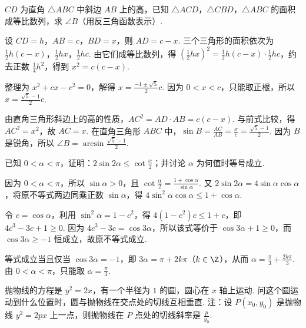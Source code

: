 \begin{problem}
\(CD\) 为直角 \(\triangle ABC\) 中斜边 \(AB\) 上的高，已知 \(\triangle ACD\)，\(\triangle CBD\)，\(\triangle ABC\) 的面积成等比数列，求 \(\angle B\)（用反三角函数表示）.
\end{problem}

\begin{solution}
设 \(CD=h\)，\(AB=c\)，\(BD=x\)，则 \(AD=c-x\). 三个三角形的面积依次为 \(\frac12h(c-x)\)，\(\frac12hx\)，\(\frac12hc\). 由它们成等比数列，得 \(\left(\frac12hx\right)^2=\frac12h(c-x)\cdot\frac12hc\)，约去正数 \(\frac14h^2\)，得到 \(x^2=c(c-x)\).

整理为 \(x^2+cx-c^2=0\)，解得 \(x=\frac{-1\pm\sqrt{5}}{2}c\). 因为 \(0<x<c\)，只能取正根，所以 \(x=\frac{\sqrt{5}-1}{2}c\).

由直角三角形斜边上的高的性质，\(AC^2=AD\cdot AB=c(c-x)\). 与前式比较，得 \(AC^2=x^2\)，故 \(AC=x\). 在直角三角形 \(ABC\) 中，\(\sin B=\frac{AC}{AB}=\frac{x}{c}=\frac{\sqrt{5}-1}{2}\). 因为 \(B\) 是锐角，所以 \(\angle B=\arcsin\frac{\sqrt{5}-1}{2}\).
\end{solution}

\begin{problem}
已知 \(0 < \alpha < \pi\)，证明：\(2\sin 2\alpha\leqslant\cot\frac{\alpha}{2}\)；并讨论 \(\alpha\) 为何值时等号成立.
\end{problem}

\begin{solution}
因为 \(0<\alpha<\pi\)，所以 \(\sin\alpha>0\)，且 \(\cot\frac{\alpha}{2}=\frac{1+\cos\alpha}{\sin\alpha}\). 又 \(2\sin 2\alpha=4\sin\alpha\cos\alpha\)，将原不等式两边同乘正数 \(\sin\alpha\)，得 \(4\sin^{2}\alpha\cos\alpha\leqslant1+\cos\alpha\).

令 \(c=\cos\alpha\)，利用 \(\sin^{2}\alpha=1-c^{2}\)，得 \(4(1-c^{2})c\leqslant1+c\)，即 \(4c^{3}-3c+1\geqslant0\). 因为 \(4c^{3}-3c=\cos 3\alpha\)，所以该式等价于 \(\cos 3\alpha+1\geqslant0\)，而 \(\cos 3\alpha\geqslant-1\) 恒成立，故原不等式成立.

等式成立当且仅当 \(\cos 3\alpha=-1\)，即 \(3\alpha=\pi+2k\pi\)（\(k\in\Z\)），从而 \(\alpha=\frac{\pi}{3}+\frac{2k\pi}{3}\). 由 \(0<\alpha<\pi\)，只能取 \(\alpha=\frac{\pi}{3}\).
\end{solution}

\begin{problem}
抛物线的方程是 \(y^{2}=2x\)，有一个半径为 \(1\) 的圆，圆心在 \(x\) 轴上运动. 问这个圆运动到什么位置时，圆与抛物线在交点处的切线互相垂直.
注：设 \(P(x_0,y_0)\) 是抛物线 \(y^{2}=2px\) 上一点，则抛物线在 \(P\) 点处的切线斜率是 \(\frac{p}{y_0}\).
\end{problem}

